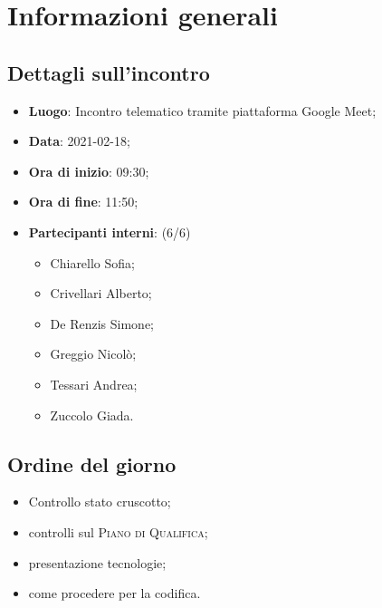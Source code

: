 \section{Informazioni generali}

\subsection{Dettagli sull'incontro}
\begin{itemize}
\item \textbf{Luogo}: Incontro telematico tramite piattaforma Google Meet;
\item \textbf{Data}: 2021-02-18;
\item \textbf{Ora di inizio}: 09:30;
\item \textbf{Ora di fine}: 11:50;
\item \textbf{Partecipanti interni}: (6/6)
\begin{itemize}
	\item Chiarello Sofia;
	\item Crivellari Alberto;
	\item De Renzis Simone;
	\item Greggio Nicolò;
	\item Tessari Andrea;
	\item Zuccolo Giada.
\end{itemize}
\end{itemize}

\subsection{Ordine del giorno}

\begin{itemize}
	\item Controllo stato cruscotto;
	\item controlli sul \textsc{Piano di Qualifica};
    \item presentazione tecnologie;
    \item come procedere per la codifica.
\end{itemize}




